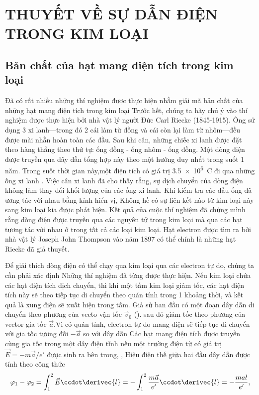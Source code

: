 

\chapter[THUYẾT VỀ SỰ DẪN ĐIỆN\\ TRONG KIM LOẠI]{THUYẾT VỀ SỰ DẪN ĐIỆN\\ TRONG KIM LOẠI}\label{chap:11}

\section{Bản chất của hạt mang điện tích trong kim loại}\label{sec:11_1}

Đã có rất nhiều những thí nghiệm được thực hiện nhằm giải mã bản chất của những hạt mang điện tích trong kim loại
Trước hết, chúng ta hãy chú ý vào thí nghiệm được thực hiện bởi nhà vật lý người Đức Carl Riecke (1845-1915).
Ông sử dụng 3 xi lanh---trong đó 2 cái làm từ đồng và cái còn lại làm từ nhôm---đều được mài nhẵn hoàn toàn các đầu.
Sau khi cân, những chiếc xi lanh được đặt theo hàng thẳng theo thứ tự: ống đồng - ống nhôm - ống đồng. 
Một dòng điện được truyền qua dây dẫn tổng hợp này theo một hướng duy nhất trong suốt 1 năm.
Trong suốt thời gian này,một điện tích có giá trị \SI{3.5e6}{\coulomb} đi qua những ống xi lanh .
Việc cân xi lanh đã cho thấy rằng, sự dịch chuyển của dòng điện không làm thay đổi khối lượng của các ống xi lanh.
Khi kiểm tra các đầu ống đã ương tác với nhau bằng kính hiển vị, Không hề có sự liên kết nào từ kim loại này sang kim loại kia được phát hiện.
Kết quả của cuộc thí nghiệm đã chứng mình rằng dòng điện được truyền qua các nguyên tử trong kim loại mà qua các hạt tương tác với nhau ở trong tất cả các loại kim loại.
Hạt electron được tìm ra bởi nhà vật lý Joseph John Thompson vào năm 1897 có thể chính là những hạt Riecke đã giả thuyết.

Để giải thích dòng điện có thể chạy qua kim loại qua các electron tự do, chúng ta cần phải xác định 
Những thí nghiệm đã từng được thực hiện. Nếu kim loại chứa các hạt điện tích dịch chuyển, thì khi một tấm kim loại giảm tốc, các hạt điện tích này sẽ theo tiếp tục di chuyển theo quán tính trong 1 khoảng thời, và kết quả là xung điện sẽ xuất hiện trong tấm.
Giả sử ban đầu có một đoạn dây dẫn di chuyển theo phương của vecto vận tốc $\vec{v}_0$ ().
sau đó giảm tốc theo phương của vector gia tốc $\vec{a}$.Vì có quán tính, electron tự do mang điện sẽ tiếp tục di chuyển với gia tốc tương đối $-\vec{a}$ so với dây dẫn
Các hạt mang điện tích được truyền cùng gia tốc trong một dây điện tĩnh nếu một trường điện từ có giá trị $\vec{E}=-m\vec{a}/e'$ được sinh ra bên trong, \ie, Hiệu điện thế giữa hai đầu dây dẫn được tính theo công thức
\begin{equation*}
    \varphi_1 - \varphi_2 = \int_1^2 \vec{E} \ccdot \derivec{l} = -\int_1^2 \frac{m \vec{a}}{e'} \ccdot \derivec{l} = - \frac{mal}{e'},
\end{equation*}


